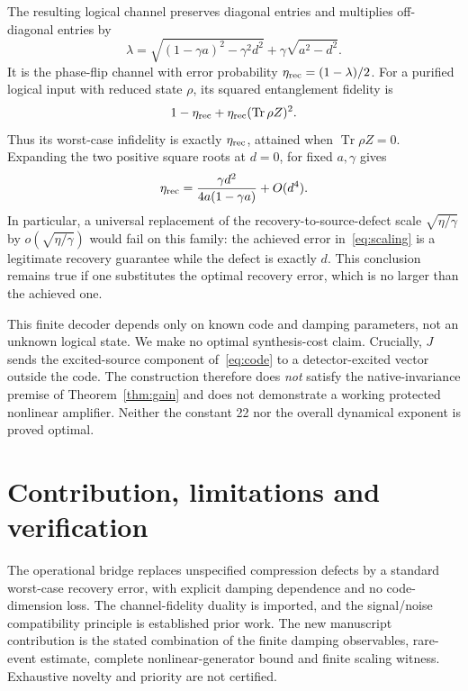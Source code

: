 \documentclass[11pt]{article}
\newcommand{\tr}{\operatorname{Tr}}
\begin{document}
The resulting logical channel preserves diagonal entries and multiplies off-diagonal entries by
\begin{equation}
 \lambda=\sqrt{(1-\gamma a)^2-\gamma^2d^2}
                 +\gamma\sqrt{a^2-d^2}.\label{eq:lambda}
\end{equation}
It is the phase-flip channel with error probability $\eta_{\rm rec}=(1-\lambda)/2$. For a purified logical input with reduced state $\rho$, its squared entanglement fidelity is
\begin{equation}
 1-\eta_{\rm rec}+\eta_{\rm rec}(\tr\rho Z)^2.
\end{equation}
Thus its worst-case infidelity is exactly $\eta_{\rm rec}$, attained when $\tr\rho Z=0$. Expanding the two positive square roots at $d=0$, for fixed $a,\gamma$ gives
\begin{equation}
 \eta_{\rm rec}=\frac{\gamma d^2}{4a(1-\gamma a)}+O(d^4).\label{eq:scaling}
\end{equation}
In particular, a universal replacement of the recovery-to-source-defect scale $\sqrt{\eta/\gamma}$ by $o(\sqrt{\eta/\gamma})$ would fail on this family: the achieved error in~\eqref{eq:scaling} is a legitimate recovery guarantee while the defect is exactly $d$. This conclusion remains true if one substitutes the optimal recovery error, which is no larger than the achieved one.

This finite decoder depends only on known code and damping parameters, not an unknown logical state. We make no optimal synthesis-cost claim. Crucially, $J$ sends the excited-source component of~\eqref{eq:code} to a detector-excited vector outside the code. The construction therefore does \emph{not} satisfy the native-invariance premise of Theorem~\ref{thm:gain} and does not demonstrate a working protected nonlinear amplifier. Neither the constant 22 nor the overall dynamical exponent is proved optimal.

\section{Contribution, limitations and verification}
The operational bridge replaces unspecified compression defects by a standard worst-case recovery error, with explicit damping dependence and no code-dimension loss. The channel-fidelity duality is imported, and the signal/noise compatibility principle is established prior work. The new manuscript contribution is the stated combination of the finite damping observables, rare-event estimate, complete nonlinear-generator bound and finite scaling witness. Exhaustive novelty and priority are not certified.
\end{document}
